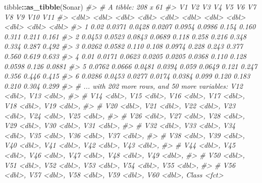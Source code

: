 \documentclass[]{book}
\newenvironment{Shaded}{\begin{snugshade}}{\end{snugshade}}
\newcommand{\CommentTok}[1]{\textcolor[rgb]{0.56,0.35,0.01}{\textit{#1}}}
\newcommand{\DataTypeTok}[1]{\textcolor[rgb]{0.13,0.29,0.53}{#1}}
\newcommand{\FloatTok}[1]{\textcolor[rgb]{0.00,0.00,0.81}{#1}}
\newcommand{\KeywordTok}[1]{\textcolor[rgb]{0.13,0.29,0.53}{\textbf{#1}}}
\newcommand{\NormalTok}[1]{#1}
\newcommand{\OperatorTok}[1]{\textcolor[rgb]{0.81,0.36,0.00}{\textbf{#1}}}
\newcommand{\OtherTok}[1]{\textcolor[rgb]{0.56,0.35,0.01}{#1}}
\newcommand{\StringTok}[1]{\textcolor[rgb]{0.31,0.60,0.02}{#1}}
\begin{document}
\begin{Shaded}
\begin{Highlighting}[]
\NormalTok{tibble}\OperatorTok{::}\KeywordTok{as_tibble}\NormalTok{(Sonar)}
\CommentTok{#> # A tibble: 208 x 61}
\CommentTok{#>       V1     V2     V3     V4     V5     V6    V7    V8     V9   V10    V11}
\CommentTok{#>    <dbl>  <dbl>  <dbl>  <dbl>  <dbl>  <dbl> <dbl> <dbl>  <dbl> <dbl>  <dbl>}
\CommentTok{#> 1 0.02   0.0371 0.0428 0.0207 0.0954 0.0986 0.154 0.160 0.311  0.211 0.161 }
\CommentTok{#> 2 0.0453 0.0523 0.0843 0.0689 0.118  0.258  0.216 0.348 0.334  0.287 0.492 }
\CommentTok{#> 3 0.0262 0.0582 0.110  0.108  0.0974 0.228  0.243 0.377 0.560  0.619 0.633 }
\CommentTok{#> 4 0.01   0.0171 0.0623 0.0205 0.0205 0.0368 0.110 0.128 0.0598 0.126 0.0881}
\CommentTok{#> 5 0.0762 0.0666 0.0481 0.0394 0.059  0.0649 0.121 0.247 0.356  0.446 0.415 }
\CommentTok{#> 6 0.0286 0.0453 0.0277 0.0174 0.0384 0.099  0.120 0.183 0.210  0.304 0.299 }
\CommentTok{#> # ... with 202 more rows, and 50 more variables: V12 <dbl>, V13 <dbl>,}
\CommentTok{#> #   V14 <dbl>, V15 <dbl>, V16 <dbl>, V17 <dbl>, V18 <dbl>, V19 <dbl>,}
\CommentTok{#> #   V20 <dbl>, V21 <dbl>, V22 <dbl>, V23 <dbl>, V24 <dbl>, V25 <dbl>,}
\CommentTok{#> #   V26 <dbl>, V27 <dbl>, V28 <dbl>, V29 <dbl>, V30 <dbl>, V31 <dbl>,}
\CommentTok{#> #   V32 <dbl>, V33 <dbl>, V34 <dbl>, V35 <dbl>, V36 <dbl>, V37 <dbl>,}
\CommentTok{#> #   V38 <dbl>, V39 <dbl>, V40 <dbl>, V41 <dbl>, V42 <dbl>, V43 <dbl>,}
\CommentTok{#> #   V44 <dbl>, V45 <dbl>, V46 <dbl>, V47 <dbl>, V48 <dbl>, V49 <dbl>,}
\CommentTok{#> #   V50 <dbl>, V51 <dbl>, V52 <dbl>, V53 <dbl>, V54 <dbl>, V55 <dbl>,}
\CommentTok{#> #   V56 <dbl>, V57 <dbl>, V58 <dbl>, V59 <dbl>, V60 <dbl>, Class <fct>}
\end{Highlighting}
\end{Shaded}

\begin{Shaded}
\end{Shaded}
\end{document}
